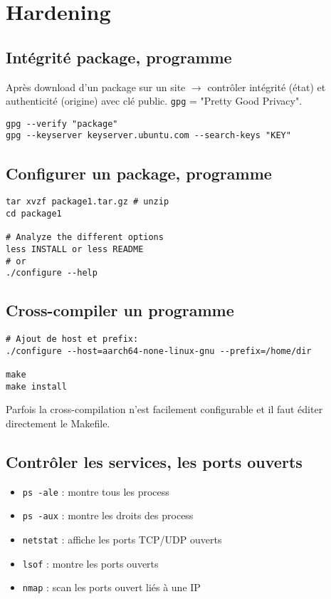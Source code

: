 \section{Hardening}
\subsection{Intégrité package, programme}
Après download d'un package sur un site $\rightarrow$ contrôler intégrité (état) et authenticité (origine) avec clé public. \verb!gpg! = "Pretty Good Privacy".
\begin{lstlisting}[style=console]
gpg --verify "package"
gpg --keyserver keyserver.ubuntu.com --search-keys "KEY"
\end{lstlisting}
\subsection{Configurer un package, programme}
\begin{lstlisting}[style=console]
tar xvzf package1.tar.gz # unzip
cd package1

# Analyze the different options
less INSTALL or less README
# or
./configure --help
\end{lstlisting}
\subsection{Cross-compiler un programme}
\begin{lstlisting}[style=console]
# Ajout de host et prefix:
./configure --host=aarch64-none-linux-gnu --prefix=/home/dir

make 
make install
\end{lstlisting}

Parfois la cross-compilation n'est facilement configurable et il faut éditer directement le Makefile.
\subsection{Contrôler les services, les ports ouverts}
\begin{itemize}
    \item \verb!ps -ale! : montre tous les process
    \item \verb!ps -aux! : montre les droits des process
    \item \verb!netstat! : affiche les ports TCP/UDP ouverts
    \item \verb!lsof!    : montre les ports ouverts
    \item \verb!nmap!    : scan les ports ouvert liés à une IP
\end{itemize}
